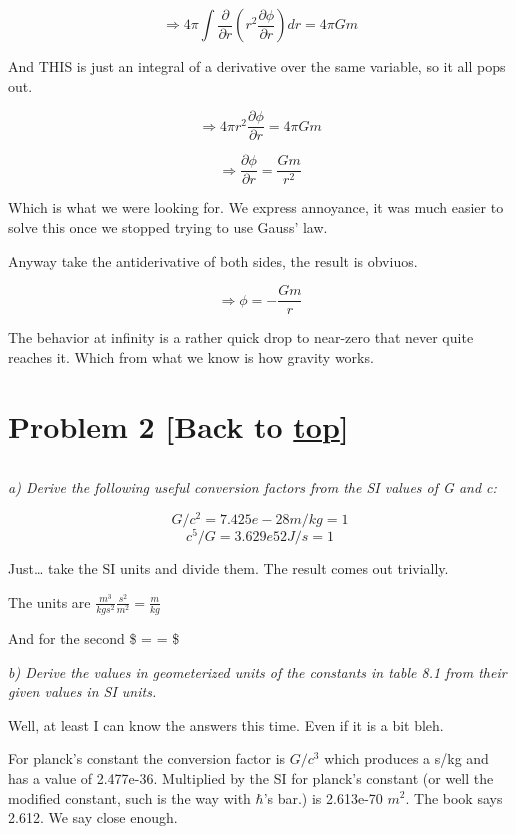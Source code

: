 \documentclass[landscape,letterpaper,10pt,english]{article}
\begin{document}
\[  \Rightarrow 4 \pi \int \frac{\partial}{\partial r} (r^2 \frac{\partial \phi}{\partial r}) dr = 4\pi G m \]

And THIS is just an integral of a derivative over the same variable, so
it all pops out.

\[ \Rightarrow  4 \pi r^2 \frac{\partial \phi}{\partial r} = 4\pi G m \]

\[ \Rightarrow  \frac{\partial \phi}{\partial r} = \frac{G m}{r^2} \]

Which is what we were looking for. We express annoyance, it was much
easier to solve this once we stopped trying to use Gauss' law.

    Anyway take the antiderivative of both sides, the result is obviuos.

\[ \Rightarrow \phi = -\frac{G m}{r} \]

    The behavior at infinity is a rather quick drop to near-zero that never
quite reaches it. Which from what we know is how gravity works.

    \hypertarget{problem-2-back-to-top}{%
\section{\texorpdfstring{Problem 2 {[}Back to
\hyperref[toc]{top}{]}}{Problem 2 {[}Back to {]}}}\label{problem-2-back-to-top}}

\[\label{P2}\]

\emph{a) Derive the following useful conversion factors from the SI
values of G and c:}

\[ G/c^2 = 7.425e-28  m/kg = 1 \] \[ c^5/G = 3.629e52 J/s = 1 \]

    Just\ldots{} take the SI units and divide them. The result comes out
trivially.

The units are \(\frac{m^3}{kg s^2} \frac{s^2}{m^2} = \frac{m}{kg}\)

And for the second \$  =
 =  \$

    \emph{b) Derive the values in geometerized units of the constants in
table 8.1 from their given values in SI units.}

Well, at least I can know the answers this time. Even if it is a bit
bleh.

For planck's constant the conversion factor is \(G/c^3\) which produces
a s/kg and has a value of 2.477e-36. Multiplied by the SI for planck's
constant (or well the modified constant, such is the way with
\(\hbar\)'s bar.) is 2.613e-70 \(m^2\). The book says 2.612. We say
close enough.
\end{document}
